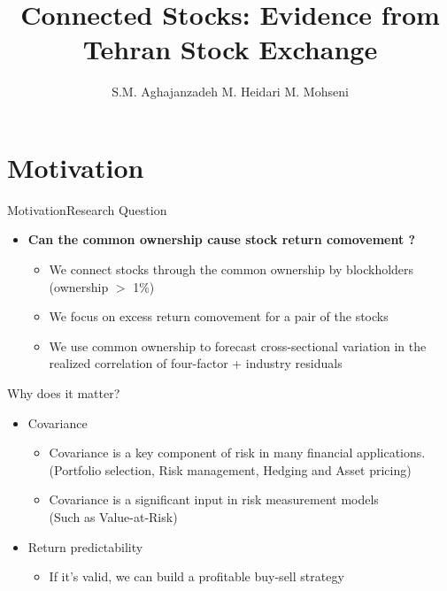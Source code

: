 \documentclass{beamer}
\title[Connected Stocks ]{Connected Stocks: Evidence from Tehran Stock Exchange}
\author[Aghajanzadeh, Heidari \& Mohseni]{S.M. Aghajanzadeh \qquad M. Heidari \qquad M. Mohseni }
\institute[TeIAS]{Tehran Institute for Advanced Studies }
\begin{document}
	\maketitle
	
	
	
	\section{Motivation}
	
	
	
	\begin{frame}{Motivation}{Research Question}
		
		\begin{itemize}
			\item\textbf{Can the common ownership cause stock return comovement ?}
			\begin{itemize}
				\item We connect stocks through the common ownership by blockholders (ownership $ > $ 1\%) 
				\item We focus on excess return comovement for a pair of the stocks
				\item We use common ownership to forecast cross-sectional variation in the realized correlation of four-factor + industry residuals
			\end{itemize}
		\end{itemize}
		
	\end{frame}
	
	\begin{frame}{Why does it matter?}
		\begin{itemize}
			\item Covariance
			\begin{itemize}
				\item Covariance is a key component of risk in
				many financial applications.
				\scriptsize(Portfolio selection, Risk management, Hedging and Asset
				pricing)
				\small
				\item Covariance is a significant input in risk measurement models \\ \scriptsize(Such as Value-at-Risk)\small
				
			\end{itemize}
			\item Return predictability
			\begin{itemize}
				\item If it's valid, we can build a profitable buy-sell strategy
			\end{itemize}
		\end{itemize}
		
	\end{frame}
	
\end{document}
